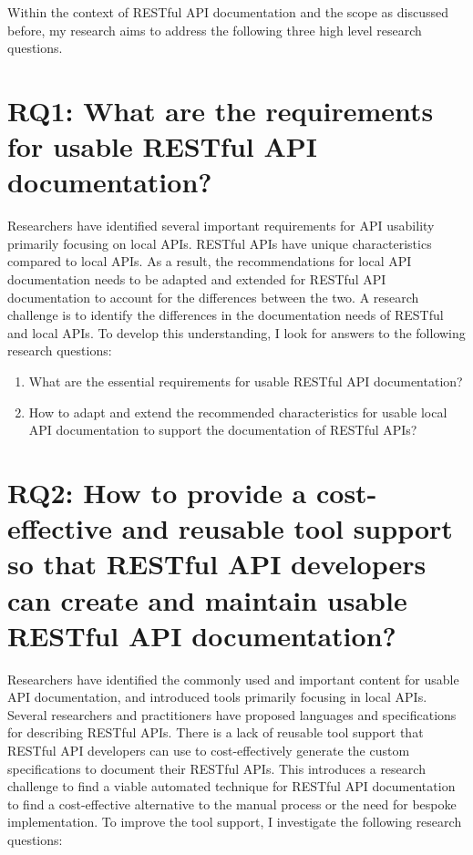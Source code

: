 \documentclass[11pt,oneside]{book}
\begin{document}
Within the context of RESTful API documentation and the scope as discussed before, my research aims to address the following three high level research questions.

\section{RQ1: What are the requirements for usable RESTful API documentation?
}

Researchers have identified several important requirements for API usability primarily focusing on local APIs. RESTful APIs have unique characteristics compared to local APIs. As a result, the recommendations for local API documentation needs to be adapted and extended for RESTful API documentation to account for the differences between the two. A research challenge is to identify the differences in the documentation needs of RESTful and local APIs. To develop this understanding, I look for answers to the following research questions:

\begin{enumerate}
  \item What are the essential requirements for usable RESTful API documentation?
  \item How to adapt and extend the recommended characteristics for usable local API documentation to support the documentation of RESTful APIs?
\end{enumerate}

\section{RQ2: How to provide a cost-effective and reusable tool support so that RESTful API developers can create and maintain usable RESTful API documentation?
} %

Researchers have identified the commonly used and important content for usable API documentation, and introduced tools primarily focusing in local APIs. Several researchers and practitioners have proposed languages and specifications for describing RESTful APIs. There is a lack of reusable tool support that RESTful API developers can use to cost-effectively generate the custom specifications to document their RESTful APIs. This introduces a research challenge to find a viable automated technique for RESTful API documentation to find a cost-effective alternative to the manual process or the need for bespoke implementation. To improve the tool support, I investigate the following research questions:
\end{document}
